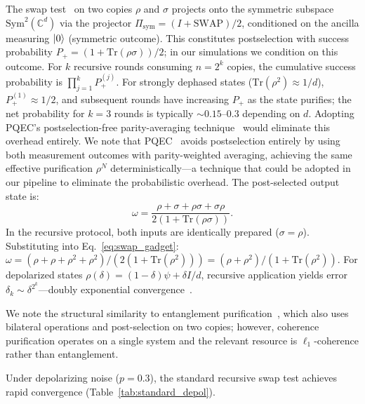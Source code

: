\documentclass[prx,twocolumn,superscriptaddress,longbibliography,floatfix]{revtex4-2}
\begin{document}
The swap test~\cite{Childs2025,Barenco1997} on two copies $\rho$ and $\sigma$ projects onto the symmetric subspace $\mathrm{Sym}^2(\mathbb{C}^d)$ via the projector $\Pi_\mathrm{sym} = (I + \mathrm{SWAP})/2$, conditioned on the ancilla measuring $\ket{0}$ (symmetric outcome).
This constitutes postselection with success probability $P_+ = (1 + \mathrm{Tr}(\rho\sigma))/2$; in our simulations we condition on this outcome.
For $k$ recursive rounds consuming $n = 2^k$ copies, the cumulative success probability is $\prod_{j=1}^k P_+^{(j)}$.
For strongly dephased states ($\mathrm{Tr}(\rho^2) \approx 1/d$), $P_+^{(1)} \approx 1/2$, and subsequent rounds have increasing $P_+$ as the state purifies; the net probability for $k = 3$ rounds is typically $\sim\!0.15$--$0.3$ depending on $d$.
Adopting PQEC's postselection-free parity-averaging technique~\cite{Raghoonanan2026} would eliminate this overhead entirely.
We note that PQEC~\cite{Raghoonanan2026} avoids postselection entirely by using both measurement outcomes with parity-weighted averaging, achieving the same effective purification $\rho^N$ deterministically---a technique that could be adopted in our pipeline to eliminate the probabilistic overhead.
The post-selected output state is:
\begin{equation}
\omega = \frac{\rho + \sigma + \rho\sigma + \sigma\rho}{2(1 + \mathrm{Tr}(\rho\sigma))}.
\label{eq:swap_gadget}
\end{equation}
In the recursive protocol, both inputs are identically prepared ($\sigma = \rho$).
Substituting into Eq.~\eqref{eq:swap_gadget}: $\omega = (\rho + \rho + \rho^2 + \rho^2)/(2(1 + \mathrm{Tr}(\rho^2))) = (\rho + \rho^2)/(1 + \mathrm{Tr}(\rho^2))$.
For depolarized states $\rho(\delta) = (1-\delta)\psi + \delta I/d$, recursive application yields error $\delta_k \sim \delta^{2^k}$---doubly exponential convergence~\cite{Childs2025}.

We note the structural similarity to entanglement purification~\cite{Bennett1996}, which also uses bilateral operations and post-selection on two copies; however, coherence purification operates on a single system and the relevant resource is $\ell_1$-coherence rather than entanglement.

Under depolarizing noise ($p = 0.3$), the standard recursive swap test achieves rapid convergence (Table~\ref{tab:standard_depol}).
\end{document}
